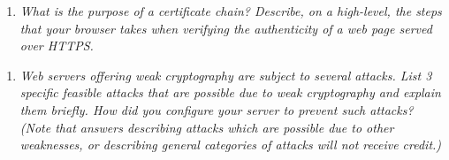 
\begin{enumerate}
    \item \itshape  What is the purpose of a certificate chain? Describe, on a high-level, the steps that your
          browser takes when verifying the authenticity of a web page served over \textnormal{HTTPS}.
\end{enumerate}




\begin{enumerate}[resume]
    \item \itshape Web servers offering weak cryptography are subject to several attacks. List 3 specific
          feasible attacks that are possible due to weak cryptography and explain them briefly. How
          did you configure your server to prevent such attacks? (Note that answers describing attacks
          which are possible due to other weaknesses, or describing general categories of attacks will not
          receive credit.)
\end{enumerate}



